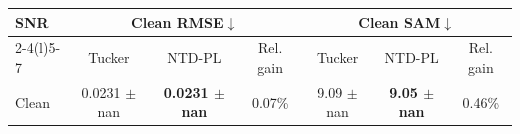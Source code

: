 \begin{tabular}{@{}lcccccc@{}}
\toprule
\multirow{2}{*}{SNR} &
\multicolumn{3}{c}{Clean RMSE$\downarrow$} &
\multicolumn{3}{c}{Clean SAM$\downarrow$} \\
\cmidrule(lr){2-4}\cmidrule(l){5-7}
& Tucker & NTD-PL & Rel. gain &
Tucker & NTD-PL & Rel. gain \\
\midrule
Clean & 0.0231 $\pm$ nan & \textbf{0.0231 $\pm$ nan} & 0.07\%
& 9.09 $\pm$ nan & \textbf{9.05 $\pm$ nan} & 0.46\% \\
\bottomrule
\end{tabular}
